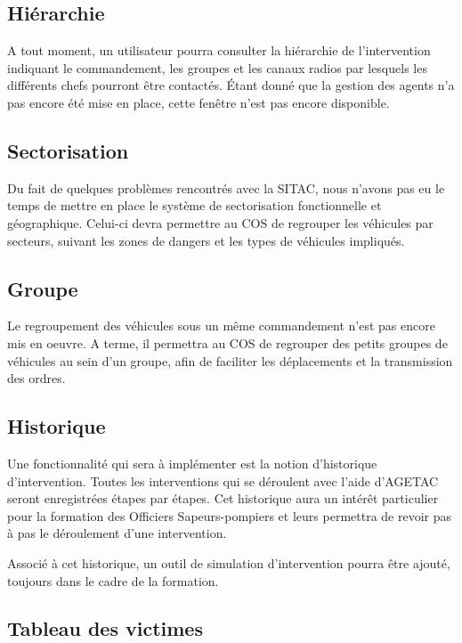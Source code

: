 \documentclass{article}
\begin{document}
\subsection{Hiérarchie}

A tout moment, un utilisateur pourra consulter la hiérarchie de l’intervention indiquant le commandement, les groupes et les canaux radios par lesquels les différents chefs pourront être contactés. Étant donné que la gestion des agents n’a pas encore été mise en place, cette fenêtre n’est pas encore disponible.

\subsection{Sectorisation}

Du fait de quelques problèmes rencontrés avec la SITAC, nous n’avons pas eu le temps de mettre en place le système de sectorisation fonctionnelle et géographique. Celui-ci devra permettre au COS de regrouper les véhicules par secteurs, suivant les zones de dangers et les types de véhicules impliqués.

\subsection{Groupe }

Le regroupement des véhicules sous un même commandement n’est pas encore mis en oeuvre. A terme, il permettra au COS de regrouper des petits groupes de véhicules au sein d’un groupe, afin de faciliter les déplacements et la transmission des ordres.

\subsection{Historique}

Une fonctionnalité qui sera à implémenter est la notion d’historique d’intervention. Toutes les interventions qui se déroulent avec l’aide d’AGETAC seront enregistrées étapes par étapes. Cet historique aura un intérêt particulier pour la formation des Officiers Sapeurs-pompiers et leurs permettra de revoir pas à pas le déroulement d’une intervention.

Associé à cet historique, un outil de simulation d’intervention pourra être ajouté, toujours dans le cadre de la formation.

\subsection{Tableau des victimes}
\end{document}
